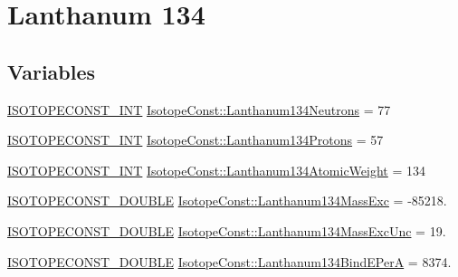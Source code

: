 \hypertarget{group___isotope_const-_lanthanum-_la134}{}\section{Lanthanum 134}
\label{group___isotope_const-_lanthanum-_la134}
\subsection*{Variables}
\begin{DoxyCompactItemize}
\item 
\mbox{\hyperlink{group___isotope_const-_macros_ga5f18360b3e99483a35c32d789e62621c}{I\+S\+O\+T\+O\+P\+E\+C\+O\+N\+S\+T\+\_\+\+I\+NT}} \mbox{\hyperlink{group___isotope_const-_lanthanum-_la134_ga920aecdbfa8e17f24810e5905db42f9e}{Isotope\+Const\+::\+Lanthanum134\+Neutrons}} = 77
\item 
\mbox{\hyperlink{group___isotope_const-_macros_ga5f18360b3e99483a35c32d789e62621c}{I\+S\+O\+T\+O\+P\+E\+C\+O\+N\+S\+T\+\_\+\+I\+NT}} \mbox{\hyperlink{group___isotope_const-_lanthanum-_la134_ga505c5a4198545f08117048acc4a21023}{Isotope\+Const\+::\+Lanthanum134\+Protons}} = 57
\item 
\mbox{\hyperlink{group___isotope_const-_macros_ga5f18360b3e99483a35c32d789e62621c}{I\+S\+O\+T\+O\+P\+E\+C\+O\+N\+S\+T\+\_\+\+I\+NT}} \mbox{\hyperlink{group___isotope_const-_lanthanum-_la134_ga0b779f1998ece4d2306453d58e99896b}{Isotope\+Const\+::\+Lanthanum134\+Atomic\+Weight}} = 134
\item 
\mbox{\hyperlink{group___isotope_const-_macros_ga8f45a7272ce02c0b4c65c44636ed719a}{I\+S\+O\+T\+O\+P\+E\+C\+O\+N\+S\+T\+\_\+\+D\+O\+U\+B\+LE}} \mbox{\hyperlink{group___isotope_const-_lanthanum-_la134_gad2676bd2749b149af3bc99a2337ef3a5}{Isotope\+Const\+::\+Lanthanum134\+Mass\+Exc}} = -\/85218.
\item 
\mbox{\hyperlink{group___isotope_const-_macros_ga8f45a7272ce02c0b4c65c44636ed719a}{I\+S\+O\+T\+O\+P\+E\+C\+O\+N\+S\+T\+\_\+\+D\+O\+U\+B\+LE}} \mbox{\hyperlink{group___isotope_const-_lanthanum-_la134_ga2ffedbb0a032c582b951a318a83ff84e}{Isotope\+Const\+::\+Lanthanum134\+Mass\+Exc\+Unc}} = 19.
\item 
\mbox{\hyperlink{group___isotope_const-_macros_ga8f45a7272ce02c0b4c65c44636ed719a}{I\+S\+O\+T\+O\+P\+E\+C\+O\+N\+S\+T\+\_\+\+D\+O\+U\+B\+LE}} \mbox{\hyperlink{group___isotope_const-_lanthanum-_la134_gae8e43f5eae5fbc576dce6c2567d1369f}{Isotope\+Const\+::\+Lanthanum134\+Bind\+E\+PerA}} = 8374.
\item 

\end{DoxyCompactItemize}
